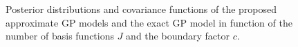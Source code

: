 \documentclass[]{interact}
\theoremstyle{plain}%
\theoremstyle{definition}
\theoremstyle{remark}
\begin{document}
\begin{figure}[H]
\centering
{}
\caption{Posterior distributions and covariance functions of the proposed approximate GP models and the exact GP model in function of the number of basis functions $J$ and the boundary factor $c$.}
  \label{fig4_Post_&_Cov_part1}
\end{figure}
\end{document}
